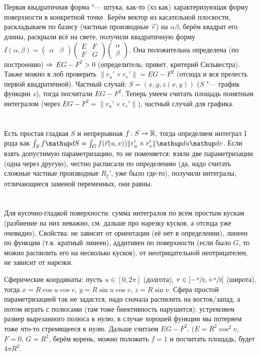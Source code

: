 \section{} %
Первая квадратичная форма "--- штука, как-то (хз как) характеризующая форму поверхности в конкретной точке.
Берём вектор из касательной плоскости, раскладываем по базису (частные производные $\vec r$) на $\alpha \beta$,
берём квадрат его длины, раскрыли всё на свете, получили квадратичную форму $I(\alpha, \beta)=\begin{pmatrix}\alpha & \beta\end{pmatrix} \begin{pmatrix} E & F \\ F & G\end{pmatrix} \begin{pmatrix} \alpha \\ \beta \end{pmatrix}$.
Она положительна определена (по построению) $\Rightarrow$ $EG-F^2 > 0$ (определитель; привет, критерий Сильвестра).
Также можно в лоб проверить $\|r_u' \times r_v'\| = EG-F^2$ (отсюда и вся прелесть первой квадратичной).
Частный случай: $S=(x, y, z(x, y))$ ($S$ "--- график функции $z$), тогда посчитали $EG-F^2$.
Теперь умеем считать площадь понятным интегралом (через $EG-F^2=\|r_u' \times r_v'\|$), частный случай для графика.

\section{} %
Есть простая гладкая $S$ и непрерывная $f \colon S \to \mathbb{R}$, тогда определяем интеграл I рода как
$\int_S f \d S = \int_G f(\vec r(u, v))\|r_u'\times r_v'\| \d u \d v$.
Если взять допустимую параметризацию, то не поменяется: взяли две параметризации (одна через другую),
честно расписали по определению (да, надо считать сложные частные производные $R_\xi'$, уже было где-то),
получили интегралы, отличающиеся заменой переменных, они равны.

\section{} %
Для кусочно-гладкой поверхности: сумма интегралов по всем простым кускам (разбиение на них неважно, см. дальше про нарезку кусков, а отсюда уже очевидно).
Свойства: не зависит от ориентации (её нет в определении), линеен по функции (т.к. кратный линеен),
аддитивен по поверхности (если было $G$, то можно распилить его на несколько кусков), от неотрицательной неотрицателен,
не зависит от нарезки.

Сферические координаты: пусть $u \in [0, 2\pi]$ (долгота), $v \in [-\sfrac\pi 2, +\sfrac\pi 2]$ (широта),
тогда $x=R \cos u \cos v$, $y = R\sin u \cos v$, $z = R \sin v$.
Сфера простой параметризацией так не задастся, надо сначала распилить на восток/запад, а потом играть с полюсами (там тоже биективность нарушится):
устремляем размер вырезанного полюса к нулю, в случае хорошей функции мы потеряем тоже что-то стремящееся к нулю.
Дальше считаем $EG-F^2$, ($E=R^2\cos^2 v$, $F=0$, $G=R^2$, берём корень, можно положить $f=1$ и посчитать площадь, будет $4\pi R^2$.
